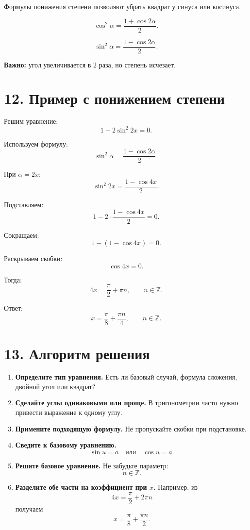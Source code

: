 \documentclass[a4paper,12pt]{article}
\newcommand{\topic}[1]{\textcolor{darkaccent}{\textbf{#1}}}
\newcommand{\important}[1]{\textcolor{darkaccent}{\textbf{#1}}}
\newcommand{\Z}{\mathbb{Z}}
\begin{document}
Формулы понижения степени позволяют убрать квадрат у синуса или косинуса.

\[
    \cos^2\alpha=\frac{1+\cos 2\alpha}{2}.
\]

\[
    \sin^2\alpha=\frac{1-\cos 2\alpha}{2}.
\]

\topic{Важно:} угол увеличивается в \(2\) раза, но степень исчезает.

\section*{12. Пример с понижением степени}

Решим уравнение:
\[
    1-2\sin^2 2x=0.
\]

Используем формулу:
\[
    \sin^2\alpha=\frac{1-\cos 2\alpha}{2}.
\]

При \(\alpha=2x\):
\[
    \sin^2 2x=\frac{1-\cos 4x}{2}.
\]

Подставляем:
\[
    1-2\cdot \frac{1-\cos 4x}{2}=0.
\]

Сокращаем:
\[
    1-(1-\cos 4x)=0.
\]

Раскрываем скобки:
\[
    \cos 4x=0.
\]

Тогда:
\[
    4x=\frac{\pi}{2}+\pi n,\qquad n\in\Z.
\]

Ответ:
\[
    \boxed{x=\frac{\pi}{8}+\frac{\pi n}{4},\qquad n\in\Z.}
\]

\section*{13. Алгоритм решения}

\begin{enumerate}
    \item \important{Определите тип уравнения.} Есть ли базовый случай, формула сложения, двойной угол или квадрат?
    \item \important{Сделайте углы одинаковыми или проще.} В тригонометрии часто нужно привести выражение к одному углу.
    \item \important{Примените подходящую формулу.} Не пропускайте скобки при подстановке.
    \item \important{Сведите к базовому уравнению.}
    \[
        \sin u=a \quad \text{или} \quad \cos u=a.
    \]
    \item \important{Решите базовое уравнение.} Не забудьте параметр:
    \[
        n\in\Z.
    \]
    \item \important{Разделите обе части на коэффициент при \(x\).} Например, из
    \[
        4x=\frac{\pi}{2}+2\pi n
    \]
    получаем
    \[
        x=\frac{\pi}{8}+\frac{\pi n}{2}.
    \]
\end{enumerate}
\end{document}
